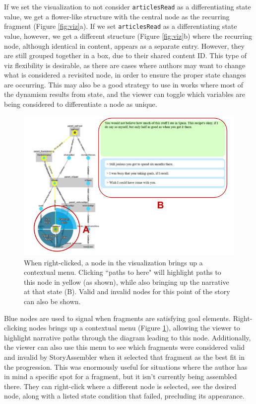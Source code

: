 If we set the visualization to not consider \texttt{articlesRead} as a differentiating state value, we get a flower-like structure with the central node as the recurring fragment (Figure \ref{fig:viz}a). If we set \texttt{articlesRead} as a differentiating state value, however, we get a different structure (Figure \ref{fig:viz}b) where the recurring node, although identical in content, appears as a separate entry. However, they are still grouped together in a box, due to their shared content ID. This type of viz flexibility is desirable, as there are cases where authors may want to change what is considered a revisited node, in order to ensure the proper state changes are occurring. This may also be a good strategy to use in works where most of the dynamism results from state, and the viewer can toggle which variables are being considered to differentiate a node as unique.


\begin{figure}
    \centering
    \includegraphics[width=\textwidth]{figures/3-StoryAssembler/viz2.png}
    \caption{When right-clicked, a node in the visualization brings up a contextual menu. Clicking ``paths to here" will highlight paths to this node in yellow (as shown), while also bringing up the narrative at that state (B). Valid and invalid nodes for this point of the story can also be shown.}
    \label{fig:viz2}
\end{figure}


Blue nodes are used to signal when fragments are satisfying goal elements. Right-clicking nodes brings up a contextual menu (Figure \ref{fig:viz2}), allowing the viewer to highlight narrative paths through the diagram leading to this node. Additionally, the viewer can also use this menu to see which fragments were considered valid and invalid by StoryAssembler when it selected that fragment as the best fit in the progression. This was enormously useful for situations where the author has in mind a specific spot for a fragment, but it isn't currently being assembled there. They can right-click where a different node is selected, see the desired node, along with a listed state condition that failed, precluding its appearance.

